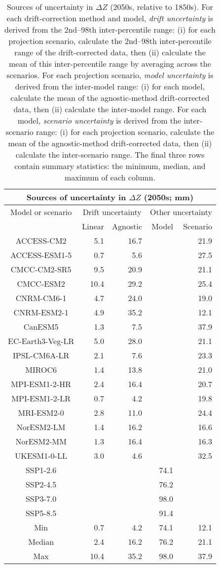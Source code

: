 \begin{table*}[t]
\centering
\caption{Sources of uncertainty in $\Delta Z$ (2050s, relative to 1850s). For each drift-correction method and model, \emph{drift uncertainty} is derived from the 2nd--98th inter-percentile range: (i) for each projection scenario, calculate the 2nd--98th inter-percentile range of the drift-corrected data, then (ii) calculate the mean of this inter-percentile range by averaging across the scenarios. For each projection scenario, \emph{model uncertainty} is derived from the inter-model range: (i) for each model, calculate the mean of the agnostic-method drift-corrected data, then (ii) calculate the inter-model range. For each model, \emph{scenario uncertainty} is derived from the inter-scenario range: (i) for each projection scenario, calculate the mean of the agnostic-method drift-corrected data, then (ii) calculate the inter-scenario range. The final three rows contain summary statistics: the minimum, median, and maximum of each column.}
\begin{tabular}{c|rr|rr}
\toprule
\multicolumn{5}{c}{Sources of uncertainty in $\Delta Z$ (2050s; mm)} \\ 
\midrule
Model or scenario & \multicolumn{2}{c|}{Drift uncertainty} & \multicolumn{2}{c}{Other uncertainty} \\
 & Linear & Agnostic & Model & Scenario \\
\midrule
ACCESS-CM2 & 5.1 & 16.7 &  & 21.9 \\
ACCESS-ESM1-5 & 0.7 & 5.6 &  & 27.5 \\
CMCC-CM2-SR5 & 9.5 & 20.9 &  & 21.1 \\
CMCC-ESM2 & 10.4 & 29.2 &  & 25.4 \\
CNRM-CM6-1 & 4.7 & 24.0 &  & 19.0 \\
CNRM-ESM2-1 & 4.9 & 35.2 &  & 12.1 \\
CanESM5 & 1.3 & 7.5 &  & 37.9 \\
EC-Earth3-Veg-LR & 5.0 & 28.0 &  & 21.1 \\
IPSL-CM6A-LR & 2.1 & 7.6 &  & 23.3 \\
MIROC6 & 1.4 & 13.8 &  & 21.0 \\
MPI-ESM1-2-HR & 2.4 & 16.4 &  & 20.7 \\
MPI-ESM1-2-LR & 0.7 & 4.2 &  & 19.8 \\
MRI-ESM2-0 & 2.8 & 11.0 &  & 24.4 \\
NorESM2-LM & 1.4 & 16.2 &  & 16.6 \\
NorESM2-MM & 1.3 & 16.4 &  & 16.3 \\
UKESM1-0-LL & 3.0 & 4.6 &  & 32.5 \\
SSP1-2.6 &  &  & 74.1 &  \\
SSP2-4.5 &  &  & 76.2 &  \\
SSP3-7.0 &  &  & 98.0 &  \\
SSP5-8.5 &  &  & 91.4 &  \\
\midrule
Min & 0.7 & 4.2 & 74.1 & 12.1 \\
Median & 2.4 & 16.2 & 76.2 & 21.1 \\
Max & 10.4 & 35.2 & 98.0 & 37.9 \\
\bottomrule
\end{tabular}
\end{table*}
